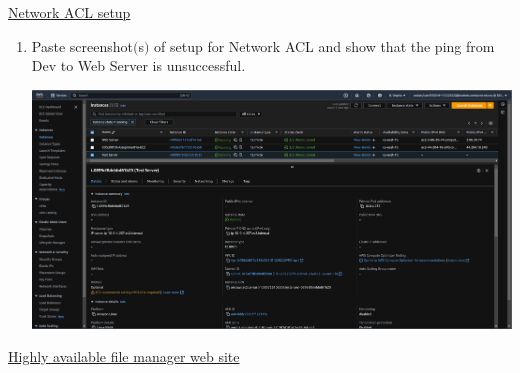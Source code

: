 \documentclass[11pt]{article}
\begin{document}
\noindent\underline{Network ACL setup}

\vspace{0.01cm}

\begin{enumerate}[resume]
    \item Paste screenshot$($s$)$ of setup for Network ACL and show that the ping from Dev to Web Server
    is unsuccessful. \\
    \vspace{-0.02mm}

    {\centering
    \includegraphics[width=5.8in]{pics/40.png}
    }    
        
\end{enumerate}
 

\noindent\underline{Highly available file manager web site}

\vspace{0.01cm}
\end{document}

